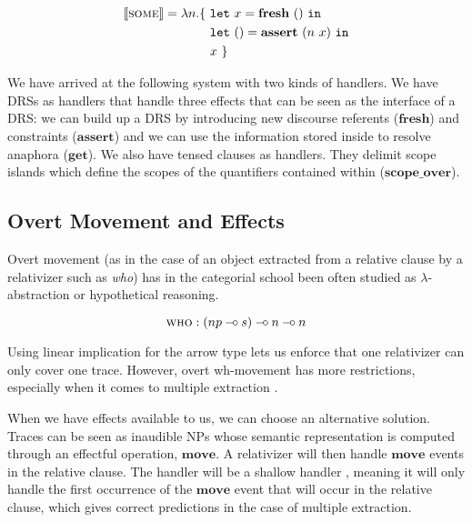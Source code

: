 \documentclass[a4paper,11pt]{easychair}
\newcommand{\sem}[1]{\llbracket #1 \rrbracket}
\newcommand{\keyword}[1]{\texttt{#1}}
\newcommand{\effect}[1]{\textbf{#1}}
\def\limp {\mathbin{{-}\mkern-3.5mu{\circ}}}
\begin{document}
\vspace{-4mm}

\begin{align*}
  \sem{\textsc{some}} = \lambda n. \{\ 
    &\keyword{let}\ x = \effect{fresh}\ ()\ \keyword{in} \\
    &\keyword{let}\ () = \effect{assert}\ (n\ x)\ \keyword{in} \\
    &x \ \}
\end{align*}

We have arrived at the following system with two kinds of handlers. We have
DRSs as handlers that handle three effects that can be seen as the interface
of a DRS: we can build up a DRS by introducing new discourse referents
($\effect{fresh}$) and constraints ($\effect{assert}$) and we can use the
information stored inside to resolve anaphora ($\effect{get}$). We also have
tensed clauses as handlers. They delimit scope islands which define the scopes
of the quantifiers contained within ($\effect{scope\_over}$).

\subsection{Overt Movement and Effects}

Overt movement (as in the case of an object extracted from a relative clause
by a relativizer such as \emph{who}) has in the categorial school been often
studied as $\lambda$-abstraction or hypothetical reasoning.

\vspace{-3mm}

$$
\textsc{who} : (np \limp s) \limp n \limp n
$$

Using linear implication for the arrow type lets us enforce that one
relativizer can only cover one trace. However, overt wh-movement has more
restrictions, especially when it comes to multiple extraction
\citep{pogodalla2012controlling}.

When we have effects available to us, we can choose an alternative
solution. Traces can be seen as inaudible NPs whose semantic representation is
computed through an effectful operation, $\effect{move}$. A relativizer will
then handle $\effect{move}$ events in the relative clause. The handler will be
a shallow handler \citep{kammar2013handlers}, meaning it will only handle the
first occurrence of the $\effect{move}$ event that will occur in the relative
clause, which gives correct predictions in the case of multiple extraction.

\vspace{-4mm}
\end{document}
